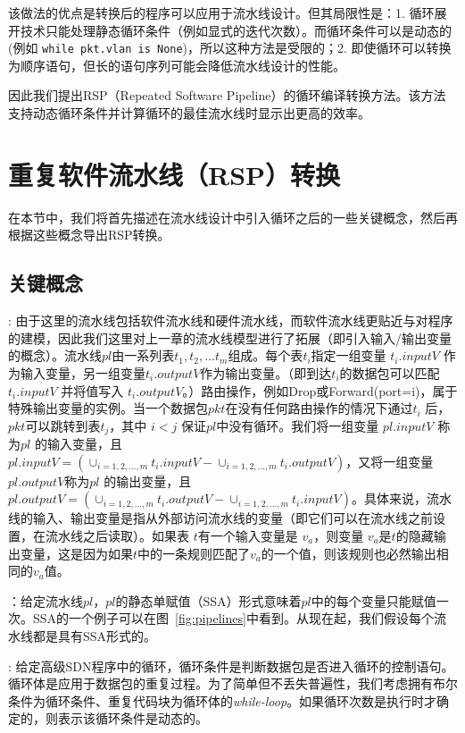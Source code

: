 \documentclass{ctexart}
\newcommand{\para}[1]{\smallskip\noindent {\bf #1}}
\newcommand{\codeword}[1]{\texttt{\small{#1}}}
\begin{document}
该做法的优点是转换后的程序可以应用于流水线设计。但其局限性是：1. 循环展开技术只能处理静态循环条件（例如显式的迭代次数）。而循环条件可以是动态的(例如 \codeword{while pkt.vlan is None})，所以这种方法是受限的；2. 即使循环可以转换为顺序语句，但长的语句序列可能会降低流水线设计的性能。

因此我们提出RSP（Repeated Software Pipeline）的循环编译转换方法。该方法支持动态循环条件并计算循环的最佳流水线时显示出更高的效率。




\section{重复软件流水线（RSP）转换}
\label{sec:model}

在本节中，我们将首先描述在流水线设计中引入循环之后的一些关键概念，然后再根据这些概念导出RSP转换。
\subsection{关键概念}
\para{流水线}: 由于这里的流水线包括软件流水线和硬件流水线，而软件流水线更贴近与对程序的建模，因此我们这里对上一章的流水线模型进行了拓展（即引入输入/输出变量的概念）。流水线$pl$由一系列表$t_1, t_2, ... t_m$组成。每个表$t_i$指定一组变量 $t_i.inputV$ 作为输入变量，另一组变量$t_i.outputV$作为输出变量。（即到达$t_i$的数据包可以匹配$t_i.inputV$ 并将值写入 $t_i.outputV$。）路由操作，例如Drop或Forward(port=i)，属于特殊输出变量的实例。当一个数据包$pkt$在没有任何路由操作的情况下通过$t_i$ 后，$pkt$可以跳转到表$t_j$，其中 $i < j$ 保证$pl$中没有循环。我们将一组变量 $pl.inputV$ 称为$pl$ 的输入变量，且$pl.inputV = (\cup_{i = 1, 2, ..., m}t_i.inputV - \cup_{i = 1, 2, ..., m}t_i.outputV)$，又将一组变量 $pl.outputV$称为$pl$ 的输出变量，且$pl.outputV = (\cup_{i = 1, 2, ..., m}t_i.outputV - \cup_{i = 1, 2, ..., m}t_i.inputV)$。具体来说，流水线的输入、输出变量是指从外部访问流水线的变量（即它们可以在流水线之前设置，在流水线之后读取）。如果表 $t$有一个输入变量是 $v_a$，则变量 $v_a$是$t$的隐藏输出变量，这是因为如果$t$中的一条规则匹配了$v_a$的一个值，则该规则也必然输出相同的$v_a$值。 

\para{静态单赋值}：给定流水线$pl$，$pl$的静态单赋值（SSA）形式意味着$pl$中的每个变量只能赋值一次。SSA的一个例子可以在图~\ref{fig:pipelines}中看到。从现在起，我们假设每个流水线都是具有SSA形式的。

\para{循环条件和循环体}: 给定高级SDN程序中的循环，循环条件是判断数据包是否进入循环的控制语句。循环体是应用于数据包的重复过程。为了简单但不丢失普遍性，我们考虑拥有布尔条件为循环条件、重复代码块为循环体的\emph{while-loop}。如果循环次数是执行时才确定的，则表示该循环条件是动态的。
\end{document}
